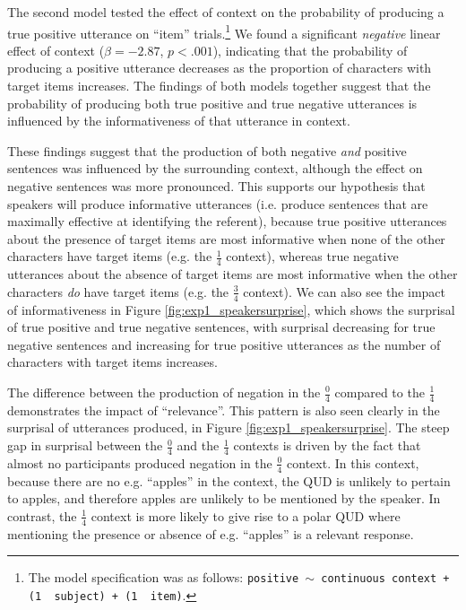 \documentclass[man, floatsintext, noapacite]{apa6}
\begin{document}
The second model tested the effect of context on the probability of producing a true positive utterance on ``item'' trials.\footnote{The model specification was as follows: \texttt{positive $\sim$  continuous context + (1~\textbar~subject) +  (1~\textbar~item)}.} We found a significant \textit{negative} linear effect of context ($\beta= -2.87$, $p< .001$), indicating that the probability of producing a positive utterance decreases as the proportion of characters with target items increases. The findings of both models together suggest that the probability of producing both true positive and true negative utterances is influenced by the informativeness of that utterance in context.

These findings suggest that the production of both negative \textit{and} positive sentences was influenced by the surrounding context, although the effect on negative sentences was more pronounced. This supports our hypothesis that speakers will produce informative utterances (i.e. produce sentences that are maximally effective at identifying the referent), because true positive utterances about the presence of target items are most informative when none of the other characters have target items (e.g. the $\frac{1}{4}$ context), whereas true negative utterances about the absence of target items are most informative when the other characters \textit{do} have target items (e.g. the $\frac{3}{4}$ context). We can also see the impact of informativeness in Figure \ref{fig:exp1_speakersurprise}, which shows the surprisal of true positive and true negative sentences, with surprisal decreasing for true negative sentences and increasing for true positive utterances as the number of characters with target items increases. 

The difference between the production of negation in the $\frac{0}{4}$ compared to the  $\frac{1}{4}$ demonstrates the impact of ``relevance''. This pattern is also seen clearly in the surprisal of utterances produced, in Figure \ref{fig:exp1_speakersurprise}. The steep gap in surprisal between the  $\frac{0}{4}$ and the  $\frac{1}{4}$ contexts is driven by the fact that almost no participants produced negation in the  $\frac{0}{4}$ context. In this context, because there are no e.g. ``apples'' in the context, the QUD is unlikely to pertain to apples, and therefore apples are unlikely to be mentioned by the speaker. In contrast, the $\frac{1}{4}$ context is more likely to give rise to a polar QUD where mentioning the presence or absence of e.g. ``apples'' is a relevant response. 
\end{document}
